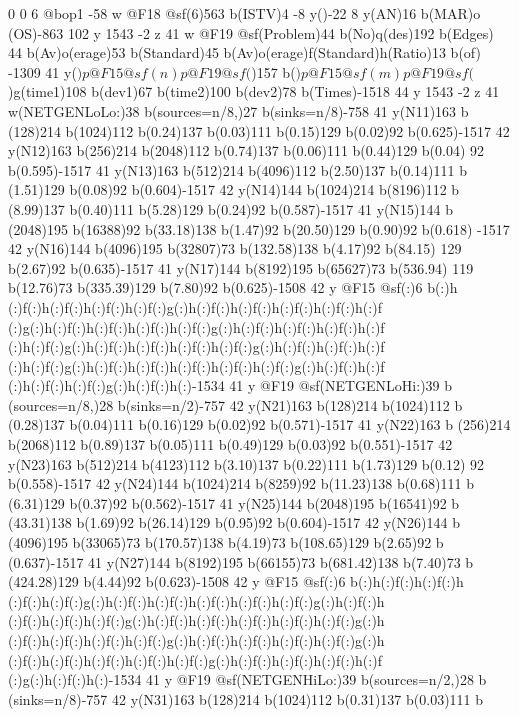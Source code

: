 {{{{{{{{{{{{{{{{{{{{{{{0 0 6 @bop1 -58 w @F18 @sf(6)563 b(ISTV)4 -8 y()-22 8 y(AN)16 b(MAR)o
(OS)-863 102 y 1543 -2 z 41 w @F19 @sf(Problem)44 b(No)q(des)192 b(Edges)
44 b(Av)o(erage)53 b(Standard)45 b(Av)o(erage)f(Standard)h(Ratio)13 b(of)
-1309 41 y(\()p @F15 @sf(n)p @F19 @sf(\))157 b(\()p @F15 @sf(m)p @F19 @sf
(\))g(time{1)108 b(dev{1)67 b(time{2)100 b(dev{2)78 b(Times)-1518 44 y 1543 
-2 z 41 w(NETGEN{Lo{Lo:)38 b(sources=n/8,)27 b(sinks=n/8)-758 41 y(N11)163 b
(128)214 b(1024)112 b(0.24)137 b(0.03)111 b(0.15)129 b(0.02)92 b(0.625)-1517 
42 y(N12)163 b(256)214 b(2048)112 b(0.74)137 b(0.06)111 b(0.44)129 b(0.04)
92 b(0.595)-1517 41 y(N13)163 b(512)214 b(4096)112 b(2.50)137 b(0.14)111 b
(1.51)129 b(0.08)92 b(0.604)-1517 42 y(N14)144 b(1024)214 b(8196)112 b
(8.99)137 b(0.40)111 b(5.28)129 b(0.24)92 b(0.587)-1517 41 y(N15)144 b
(2048)195 b(16388)92 b(33.18)138 b(1.47)92 b(20.50)129 b(0.90)92 b(0.618)
-1517 42 y(N16)144 b(4096)195 b(32807)73 b(132.58)138 b(4.17)92 b(84.15)
129 b(2.67)92 b(0.635)-1517 41 y(N17)144 b(8192)195 b(65627)73 b(536.94)
119 b(12.76)73 b(335.39)129 b(7.80)92 b(0.625)-1508 42 y @F15 @sf(:)6 b(:)h
(:)f(:)h(:)f(:)h(:)f(:)h(:)f(:)g(:)h(:)f(:)h(:)f(:)h(:)f(:)h(:)f(:)h(:)f
(:)g(:)h(:)f(:)h(:)f(:)h(:)f(:)h(:)f(:)g(:)h(:)f(:)h(:)f(:)h(:)f(:)h(:)f
(:)h(:)f(:)g(:)h(:)f(:)h(:)f(:)h(:)f(:)h(:)f(:)g(:)h(:)f(:)h(:)f(:)h(:)f
(:)h(:)f(:)g(:)h(:)f(:)h(:)f(:)h(:)f(:)h(:)f(:)h(:)f(:)g(:)h(:)f(:)h(:)f
(:)h(:)f(:)h(:)f(:)g(:)h(:)f(:)h(:)-1534 41 y @F19 @sf(NETGEN{Lo{Hi:)39 b
(sources=n/8,)28 b(sinks=n/2)-757 42 y(N21)163 b(128)214 b(1024)112 b
(0.28)137 b(0.04)111 b(0.16)129 b(0.02)92 b(0.571)-1517 41 y(N22)163 b
(256)214 b(2068)112 b(0.89)137 b(0.05)111 b(0.49)129 b(0.03)92 b(0.551)-1517 
42 y(N23)163 b(512)214 b(4123)112 b(3.10)137 b(0.22)111 b(1.73)129 b(0.12)
92 b(0.558)-1517 42 y(N24)144 b(1024)214 b(8259)92 b(11.23)138 b(0.68)111 b
(6.31)129 b(0.37)92 b(0.562)-1517 41 y(N25)144 b(2048)195 b(16541)92 b
(43.31)138 b(1.69)92 b(26.14)129 b(0.95)92 b(0.604)-1517 42 y(N26)144 b
(4096)195 b(33065)73 b(170.57)138 b(4.19)73 b(108.65)129 b(2.65)92 b
(0.637)-1517 41 y(N27)144 b(8192)195 b(66155)73 b(681.42)138 b(7.40)73 b
(424.28)129 b(4.44)92 b(0.623)-1508 42 y @F15 @sf(:)6 b(:)h(:)f(:)h(:)f(:)h
(:)f(:)h(:)f(:)g(:)h(:)f(:)h(:)f(:)h(:)f(:)h(:)f(:)h(:)f(:)g(:)h(:)f(:)h
(:)f(:)h(:)f(:)h(:)f(:)g(:)h(:)f(:)h(:)f(:)h(:)f(:)h(:)f(:)h(:)f(:)g(:)h
(:)f(:)h(:)f(:)h(:)f(:)h(:)f(:)g(:)h(:)f(:)h(:)f(:)h(:)f(:)h(:)f(:)g(:)h
(:)f(:)h(:)f(:)h(:)f(:)h(:)f(:)h(:)f(:)g(:)h(:)f(:)h(:)f(:)h(:)f(:)h(:)f
(:)g(:)h(:)f(:)h(:)-1534 41 y @F19 @sf(NETGEN{Hi{Lo:)39 b(sources=n/2,)28 b
(sinks=n/8)-757 42 y(N31)163 b(128)214 b(1024)112 b(0.31)137 b(0.03)111 b
}}}}}}}}}}}}}}}}}}}}}}}}}}}}}}}}}
